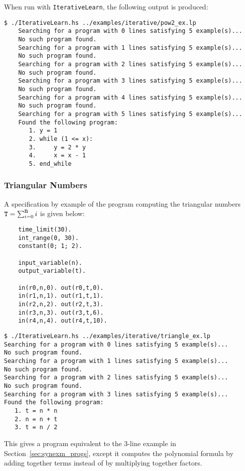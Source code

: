 \documentclass[a4paper,twoside,notitlepage]{report}
\begin{document}
When run with \verb|IterativeLearn|, the following output is produced: 
\begin{Verbatim}[samepage=true]
    $ ./IterativeLearn.hs ../examples/iterative/pow2_ex.lp 
    Searching for a program with 0 lines satisfying 5 example(s)...
    No such program found.
    Searching for a program with 1 lines satisfying 5 example(s)...
    No such program found.
    Searching for a program with 2 lines satisfying 5 example(s)...
    No such program found.
    Searching for a program with 3 lines satisfying 5 example(s)...
    No such program found.
    Searching for a program with 4 lines satisfying 5 example(s)...
    No such program found.
    Searching for a program with 5 lines satisfying 5 example(s)...
    Found the following program:
       1. y = 1
       2. while (1 <= x):
       3.     y = 2 * y
       4.     x = x - 1
       5. end_while
\end{Verbatim}

\subsubsection{Triangular Numbers}

A specification by example of the program computing the triangular numbers 
$\verb|T|=\sum_{i=0}^{\verb|n|} i$ is given below:
\begin{Verbatim}[samepage=true]
    % triangle_ex.lp
    time_limit(30).
    int_range(0, 30).
    constant(0; 1; 2).
    
    input_variable(n).
    output_variable(t).
    
    in(r0,n,0). out(r0,t,0).
    in(r1,n,1). out(r1,t,1).
    in(r2,n,2). out(r2,t,3).
    in(r3,n,3). out(r3,t,6).
    in(r4,n,4). out(r4,t,10).
\end{Verbatim}

\begin{Verbatim}[samepage=true]
$ ./IterativeLearn.hs ../examples/iterative/triangle_ex.lp 
Searching for a program with 0 lines satisfying 5 example(s)...
No such program found.
Searching for a program with 1 lines satisfying 5 example(s)...
No such program found.
Searching for a program with 2 lines satisfying 5 example(s)...
No such program found.
Searching for a program with 3 lines satisfying 5 example(s)...
Found the following program:
   1. t = n * n
   2. n = n + t
   3. t = n / 2
\end{Verbatim}
This gives a program equivalent to the 3-line example in
Section~\ref{sec:synexm_progs}, except it computes the polynomial formula 
by adding together terms instead of by multiplying together factors.
\end{document}
